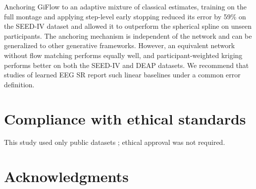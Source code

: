 \documentclass{article}
\begin{document}
Anchoring GiFlow to an adaptive mixture of classical estimates, training on
the full montage and applying step-level early stopping reduced its error
by 59\% on the SEED-IV dataset and allowed it to outperform the spherical
spline on unseen participants. The anchoring mechanism is independent of
the network and can be generalized to other generative frameworks.
However, an equivalent network without flow matching performs equally
well, and participant-weighted kriging performs better on both the SEED-IV
and DEAP datasets. We recommend that studies of learned EEG SR report such
linear baselines under a common error definition.

\section{Compliance with ethical standards}
\label{sec:ethics}

This study used only public datasets \cite{zheng2019emotionmeter,koelstra2012deap};
ethical approval was not required.

\section{Acknowledgments}
\label{sec:acknowledgments}
\end{document}
